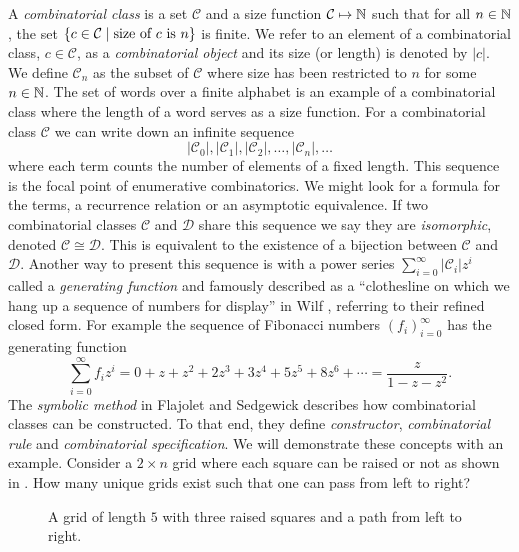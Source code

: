 A \emph{combinatorial class} is a set $\mathcal{C}$ and a size function $\mathcal{C} \mapsto \mathbb{N}$ such that for all $n\in\mathbb{N}$, the set $\left\{c \in \mathcal{C} \mid \text{size of $c$ is $n$}\right\}$ is finite. We refer to an element of a combinatorial class, $c\in\mathcal{C}$, as a \emph{combinatorial object} and its size (or length) is denoted by $|c|$. We define $\mathcal{C}_n$ as the subset of $\mathcal{C}$ where size has been restricted to $n$ for some $n\in\mathbb{N}$. The set of words over a finite alphabet is an example of a combinatorial class where the length of a word serves as a size function. For a combinatorial class $\mathcal{C}$ we can write down an infinite sequence 
\[
    |\mathcal{C}_0|, |\mathcal{C}_1|, |\mathcal{C}_2|,\dotsc,|\mathcal{C}_n|,\dotsc
\]
where each term counts the number of elements of a fixed length. This sequence is the focal point of enumerative combinatorics. We might look for a formula for the terms, a recurrence relation or an asymptotic equivalence. If two combinatorial classes $\mathcal{C}$ and $\mathcal{D}$ share this sequence we say they are \emph{isomorphic}, denoted $\mathcal{C} \cong \mathcal{D}$. This is equivalent to the existence of a bijection between $\mathcal{C}$ and $\mathcal{D}$. Another way to present this sequence is with a power series $\sum_{i=0}^\infty |\mathcal{C}_i|z^i$ called a \emph{generating function} and famously described as a ``clothesline on which we hang up a sequence of numbers for display'' in Wilf \cite{wilf:gf}, referring to their refined closed form. For example the sequence of Fibonacci numbers $\left(f_i\right)_{i=0}^\infty$ has the generating function
\[
    \sum_{i=0}^\infty f_iz^i = 0 + z + z^2 + 2z^3 + 3z^4 + 5z^5 + 8z^6 + \dotsb = \frac{z}{1-z-z^2}.
\]
The \emph{symbolic method} in Flajolet and Sedgewick \cite{flajolet:ac} describes how combinatorial classes can be constructed. To that end, they define \emph{constructor}, \emph{combinatorial rule} and \emph{combinatorial specification}. We will demonstrate these concepts with an example. Consider a $2 \times n$ grid where each square can be raised or not as shown in . How many unique grids exist such that one can pass from left to right?

\begin{figure}[ht!]
    \centering
    
    \caption{A grid of length $5$ with three raised squares and a path from left to right.}
    \label{fig:raised_grid}
\end{figure}

